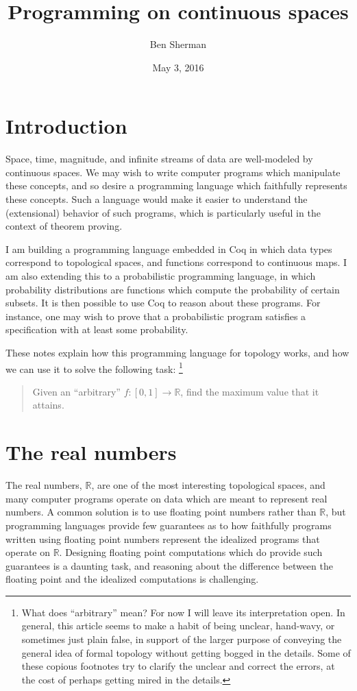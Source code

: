 \documentclass{article}
\title{Programming on continuous spaces}
\author{Ben Sherman}
\date{May 3, 2016}
\newcommand{\R}{\mathbb{R}}
\begin{document}
\maketitle

\section{Introduction}

Space, time, magnitude, and infinite streams of data are well-modeled by continuous spaces. We may wish to write computer programs which manipulate these concepts, and so desire a programming language which faithfully represents these concepts. Such a language would make it easier to understand the (extensional) behavior of such programs, which is particularly useful in the context of theorem proving.

I am building a programming language embedded in Coq in which data types correspond to topological spaces, and functions correspond to continuous maps. I am also extending this to a probabilistic programming language, in which probability distributions are functions which compute the probability of certain subsets. It is then possible to use Coq to reason about these programs. For instance, one may wish to prove that a probabilistic program satisfies a specification with at least some probability.

These notes explain how this programming language for topology works, and how we can use it to solve the following task: \footnote{What does ``arbitrary'' mean? For now I will leave its interpretation open. In general, this article seems to make a habit of being unclear, hand-wavy, or sometimes just plain false, in support of the larger purpose of conveying the general idea of formal topology without getting bogged in the details. Some of these copious footnotes try to clarify the unclear and correct the errors, at the cost of perhaps getting mired in the details.}
\begin{quote}
Given an ``arbitrary'' $f : [0,1] \to \R$, find the maximum value that it attains.
\end{quote}

\section{The real numbers}

The real numbers, $\R$, are one of the most interesting topological spaces, and many computer programs operate on data which are meant to represent real numbers. A common solution is to use floating point numbers rather than $\R$, but programming languages provide few guarantees as to how faithfully programs written using floating point numbers represent the idealized programs that operate on $\R$. Designing floating point computations which do provide such guarantees is a daunting task, and reasoning about the difference between the floating point and the idealized computations is challenging.
\end{document}
